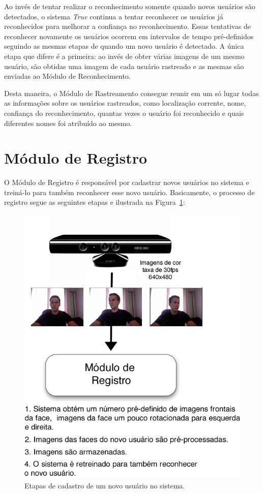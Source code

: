 	Ao invés de tentar realizar o reconhecimento somente quando novos usuários são detectados, o sistema \textit{True} continua a tentar reconhecer os usuários já reconhecidos para melhorar a confiança no reconhecimento. Essas tentativas de reconhecer novamente os usuários ocorrem em intervalos de tempo pré-definidos seguindo as mesmas etapas de quando um novo usuário é detectado. A única etapa que difere é a primeira: ao invés de obter várias imagens de um mesmo usuário, são obtidas uma imagem de cada usuário rastreado e as mesmas são enviadas ao Módulo de Reconhecimento.

	Desta maneira, o Módulo de Rastreamento consegue reunir em um só lugar todas as informações sobre os usuários rastreados, como localização corrente, nome, confiança do reconhecimento, quantas vezes o usuário foi reconhecido e quais diferentes nomes foi atribuído ao mesmo.


\section{Módulo de Registro}

	O Módulo de Registro é responsável por cadastrar novos usuários no sistema e treiná-lo para também reconhecer esse novo usuário. Basicamente, o processo de registro segue as seguintes etapas e ilustrada na Figura~\ref{fig:registro}:

		\begin{figure}[hbt]
			\begin{center}
				\includegraphics[scale=2.5]{figuras/4.ProblemaEProposta/registro.png}
			\end{center}
			\caption{Etapas de cadastro de um novo usuário no sistema.}
			\label{fig:registro}
		\end{figure}		

